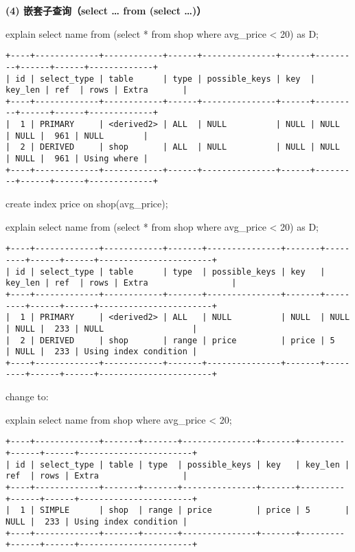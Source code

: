\documentclass[a4paper, 11pt, nofonts, nocap, fancyhdr]{ctexart}
\begin{document}
\vspace{0.7cm}

\textbf{(4) 嵌套子查询（select … from (select …)）} 

explain select name from (select * from shop where avg\_price < 20) as D;

\begin{verbatim}
+----+-------------+------------+------+---------------+------+---------+------+------+-------------+
| id | select_type | table      | type | possible_keys | key  | key_len | ref  | rows | Extra       |
+----+-------------+------------+------+---------------+------+---------+------+------+-------------+
|  1 | PRIMARY     | <derived2> | ALL  | NULL          | NULL | NULL    | NULL |  961 | NULL        |
|  2 | DERIVED     | shop       | ALL  | NULL          | NULL | NULL    | NULL |  961 | Using where |
+----+-------------+------------+------+---------------+------+---------+------+------+-------------+
\end{verbatim}

create index price on shop(avg\_price);

explain select name from (select * from shop where avg\_price < 20) as D;

\begin{verbatim}
+----+-------------+------------+-------+---------------+-------+---------+------+------+-----------------------+
| id | select_type | table      | type  | possible_keys | key   | key_len | ref  | rows | Extra                 |
+----+-------------+------------+-------+---------------+-------+---------+------+------+-----------------------+
|  1 | PRIMARY     | <derived2> | ALL   | NULL          | NULL  | NULL    | NULL |  233 | NULL                  |
|  2 | DERIVED     | shop       | range | price         | price | 5       | NULL |  233 | Using index condition |
+----+-------------+------------+-------+---------------+-------+---------+------+------+-----------------------+
\end{verbatim}

change to:

explain select name from shop where avg\_price < 20;

\begin{verbatim}
+----+-------------+-------+-------+---------------+-------+---------+------+------+-----------------------+
| id | select_type | table | type  | possible_keys | key   | key_len | ref  | rows | Extra                 |
+----+-------------+-------+-------+---------------+-------+---------+------+------+-----------------------+
|  1 | SIMPLE      | shop  | range | price         | price | 5       | NULL |  233 | Using index condition |
+----+-------------+-------+-------+---------------+-------+---------+------+------+-----------------------+
\end{verbatim}
\end{document}

